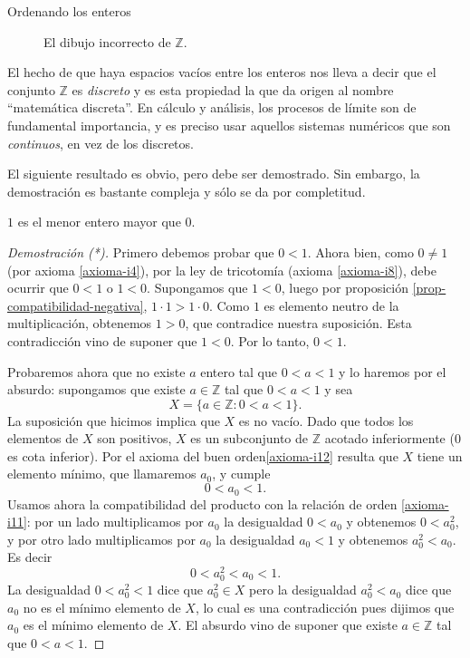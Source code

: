 \begin{section}{Ordenando los enteros}
\begin{figure}[ht]    
    \begin{center}
    \end{center}
    \caption{El dibujo incorrecto de $\mathbb Z$.}\label{f1.3}
\end{figure}

El hecho de que haya espacios vacíos entre los enteros nos lleva a decir que el conjunto $\mathbb Z$ es \textit{discreto} y es esta propiedad la que da origen al nombre ``matemática discreta''. En cálculo y análisis, los procesos de límite son de fundamental importancia, y es preciso usar aquellos sistemas numéricos que son \textit{continuos}, en vez de los discretos.

El siguiente resultado es obvio, pero  debe ser demostrado. Sin embargo,  la demostración es bastante compleja y sólo se da por completitud. 
\begin{proposicion}\label{prop-0-menor-que-1}
$1$ es el menor entero mayor que $0$.
\end{proposicion}
\begin{proof}[Demostración (*)] Primero debemos probar que $0 < 1$. Ahora bien, como $0 \not= 1$ (por axioma \ref{axioma-i4}), por la ley de tricotomía (axioma \ref{axioma-i8}), debe ocurrir que $0 < 1$ o $ 1 < 0$. Supongamos que $1 < 0$, luego por proposición \ref{prop-compatibilidad-negativa}, $1 \cdot 1 > 1 \cdot 0$. Como $1$  es elemento neutro de la multiplicación, obtenemos $1 > 0$, que contradice nuestra suposición. Esta contradicción vino de suponer que $1 < 0$. Por lo tanto, $0 < 1$.

Probaremos ahora que no existe $a$ entero tal que $ 0<a<1$ y lo haremos por el absurdo: supongamos que existe $a \in \mathbb Z$ tal que $0<a<1$ y sea 
$$
X=\{a\in\mathbb Z: 0<a<1\}.
$$
La  suposición que hicimos implica que $X$ es no vacío.  Dado que todos los elementos de $X$ son positivos, $X$ es un subconjunto de $\mathbb Z$ acotado inferiormente ($0$ es cota inferior). Por el axioma del buen orden\ref{axioma-i12} resulta que $X$ tiene un elemento mínimo, que llamaremos $a_0$, y cumple
$$
0<a_0<1. 
$$
Usamos ahora la compatibilidad del  producto con  la relación de orden \ref{axioma-i11}:  por un lado multiplicamos por $a_0$ la desigualdad $0<a_0$ y obtenemos $0<a_0^2$,  y por otro lado multiplicamos por $a_0$ la desigualdad $a_0<1$ y obtenemos $a_0^2<a_0$. Es decir
$$
 0<a_0^2<a_0<1.
$$
La desigualdad $0<a_0^2<1$ dice que $a_0^2\in X$ pero la desigualdad $a_0^2<a_0$ dice que  $a_0$ no es el mínimo elemento de $X$, lo cual es una contradicción pues dijimos que $a_0$ es el mínimo elemento de $X$.  El  absurdo  vino de suponer que existe $a \in \mathbb Z$ tal que   $0<a<1$.
\end{proof}



\end{section}
